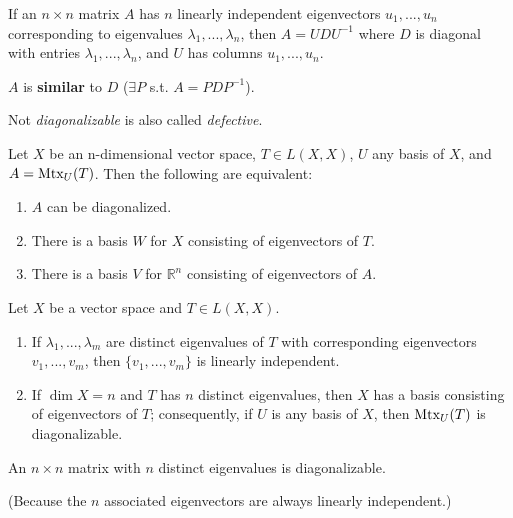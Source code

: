 \documentclass[11pt]{elegantbook}
\begin{document}
\begin{theorem}[Linearly Independent Eigenvectors $\Rightarrow$ $A=UDU^{-1}$]
    If an $n\times n$ matrix $A$ has $n$ linearly independent eigenvectors $u_1,...,u_n$ corresponding to eigenvalues $\lambda_1,...,\lambda_n$, then $A = UDU^{-1}$ where $D$ is diagonal with entries $\lambda_1,...,\lambda_n$, and $U$ has columns $u_1,...,u_n$.
\end{theorem}
$A$ is \textbf{similar} to $D$ ($\exists P$ s.t. $A=PDP^{-1}$).

Not \textit{diagonalizable} is also called \textit{defective}.


\begin{theorem}
    Let $X$ be an n-dimensional vector space, $T \in L(X, X)$, $U$ any basis of $X$, and $A = \textnormal{Mtx}_U(T)$. Then the following are equivalent:
    \begin{enumerate}
        \item $A$ can be diagonalized.
        \item There is a basis $W$ for $X$ consisting of eigenvectors of $T$.
        \item There is a basis $V$ for $\mathbb{R}^n$ consisting of eigenvectors of $A$.
    \end{enumerate}
\end{theorem}

\begin{theorem}
    Let $X$ be a vector space and $T \in L(X, X)$.
    \begin{enumerate}
        \item If $\lambda_1, . . . , \lambda_m$ are distinct eigenvalues of $T$ with corresponding eigenvectors $v_1, . . . , v_m$, then $\{v_1, . . . , v_m\}$ is linearly independent.
        \item If $\dim X = n$ and $T$ has $n$ distinct eigenvalues, then $X$ has a basis consisting of eigenvectors of $T$; consequently, if $U$ is any basis of $X$, then $\textnormal{Mtx}_U(T)$ is diagonalizable.
    \end{enumerate}
\end{theorem}

\begin{corollary}
    An $n\times n$ matrix with $n$ distinct eigenvalues is diagonalizable.
\end{corollary}
(Because the $n$ associated eigenvectors are always linearly independent.)
\end{document}
